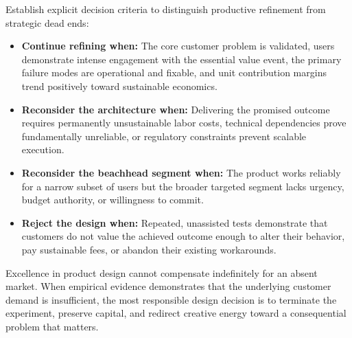 Establish explicit decision criteria to distinguish productive refinement from strategic dead ends:
\begin{itemize}[leftmargin=*]
\item \textbf{Continue refining when:} The core customer problem is validated, users demonstrate intense engagement with the essential value event, the primary failure modes are operational and fixable, and unit contribution margins trend positively toward sustainable economics.
\item \textbf{Reconsider the architecture when:} Delivering the promised outcome requires permanently unsustainable labor costs, technical dependencies prove fundamentally unreliable, or regulatory constraints prevent scalable execution.
\item \textbf{Reconsider the beachhead segment when:} The product works reliably for a narrow subset of users but the broader targeted segment lacks urgency, budget authority, or willingness to commit.
\item \textbf{Reject the design when:} Repeated, unassisted tests demonstrate that customers do not value the achieved outcome enough to alter their behavior, pay sustainable fees, or abandon their existing workarounds.
\end{itemize}

Excellence in product design cannot compensate indefinitely for an absent market. When empirical evidence demonstrates that the underlying customer demand is insufficient, the most responsible design decision is to terminate the experiment, preserve capital, and redirect creative energy toward a consequential problem that matters.
